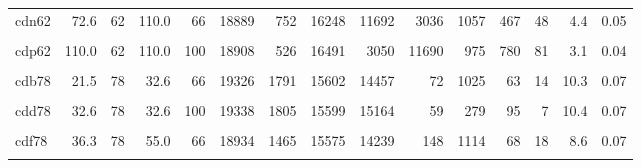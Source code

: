 \begin{landscape}
\begin{ThreePartTable}
\begin{longtable}[t]{lrrrrrrrrrrrrrr}
cdn62 & 72.6 & 62 & 110.0 & 66 & 18889 & 752 & 16248 & 11692 & 3036 & 1057 & 467 & 48 & 4.4 & 0.05\\
\cellcolor{gray!6}{cdo62} & \cellcolor{gray!6}{88.0} & \cellcolor{gray!6}{62} & \cellcolor{gray!6}{110.0} & \cellcolor{gray!6}{80} & \cellcolor{gray!6}{18908} & \cellcolor{gray!6}{466} & \cellcolor{gray!6}{16551} & \cellcolor{gray!6}{4767} & \cellcolor{gray!6}{10165} & \cellcolor{gray!6}{937} & \cellcolor{gray!6}{684} & \cellcolor{gray!6}{74} & \cellcolor{gray!6}{2.7} & \cellcolor{gray!6}{0.04}\\
cdp62 & 110.0 & 62 & 110.0 & 100 & 18908 & 526 & 16491 & 3050 & 11690 & 975 & 780 & 81 & 3.1 & 0.04\\
\cellcolor{gray!6}{cda78} & \cellcolor{gray!6}{13.0} & \cellcolor{gray!6}{78} & \cellcolor{gray!6}{32.6} & \cellcolor{gray!6}{40} & \cellcolor{gray!6}{19228} & \cellcolor{gray!6}{1872} & \cellcolor{gray!6}{15433} & \cellcolor{gray!6}{13892} & \cellcolor{gray!6}{74} & \cellcolor{gray!6}{1451} & \cellcolor{gray!6}{19} & \cellcolor{gray!6}{7} & \cellcolor{gray!6}{10.8} & \cellcolor{gray!6}{0.07}\\
cdb78 & 21.5 & 78 & 32.6 & 66 & 19326 & 1791 & 15602 & 14457 & 72 & 1025 & 63 & 14 & 10.3 & 0.07\\
\cellcolor{gray!6}{cdc78} & \cellcolor{gray!6}{26.1} & \cellcolor{gray!6}{78} & \cellcolor{gray!6}{32.6} & \cellcolor{gray!6}{80} & \cellcolor{gray!6}{19324} & \cellcolor{gray!6}{1747} & \cellcolor{gray!6}{15644} & \cellcolor{gray!6}{15172} & \cellcolor{gray!6}{27} & \cellcolor{gray!6}{408} & \cellcolor{gray!6}{37} & \cellcolor{gray!6}{6} & \cellcolor{gray!6}{10.0} & \cellcolor{gray!6}{0.06}\\
cdd78 & 32.6 & 78 & 32.6 & 100 & 19338 & 1805 & 15599 & 15164 & 59 & 279 & 95 & 7 & 10.4 & 0.07\\
\cellcolor{gray!6}{cde78} & \cellcolor{gray!6}{22.0} & \cellcolor{gray!6}{78} & \cellcolor{gray!6}{55.0} & \cellcolor{gray!6}{40} & \cellcolor{gray!6}{18942} & \cellcolor{gray!6}{1881} & \cellcolor{gray!6}{15166} & \cellcolor{gray!6}{13222} & \cellcolor{gray!6}{6} & \cellcolor{gray!6}{1907} & \cellcolor{gray!6}{26} & \cellcolor{gray!6}{4} & \cellcolor{gray!6}{11.0} & \cellcolor{gray!6}{0.07}\\
cdf78 & 36.3 & 78 & 55.0 & 66 & 18934 & 1465 & 15575 & 14239 & 148 & 1114 & 68 & 18 & 8.6 & 0.07\\
\cellcolor{gray!6}{cdg78} & \cellcolor{gray!6}{44.0} & \cellcolor{gray!6}{78} & \cellcolor{gray!6}{55.0} & \cellcolor{gray!6}{80} & \cellcolor{gray!6}{18945} & \cellcolor{gray!6}{1444} & \cellcolor{gray!6}{15606} & \cellcolor{gray!6}{14219} & \cellcolor{gray!6}{63} & \cellcolor{gray!6}{1190} & \cellcolor{gray!6}{128} & \cellcolor{gray!6}{26} & \cellcolor{gray!6}{8.5} & \cellcolor{gray!6}{0.07}\\

\end{longtable}
\end{ThreePartTable}
\end{landscape}
